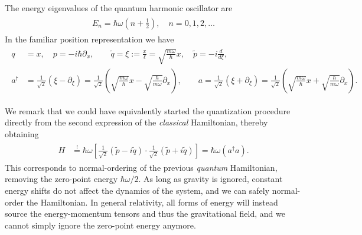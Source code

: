 \documentclass[../QFT_main.tex]{subfiles}
\begin{document}
\begin{mytheorem}
%
The energy eigenvalues of the quantum harmonic oscillator are
{\small\begin{align}\label{eq:quantum_harmonic_oscillator_spectrum}
\begin{aligned}
    E_n = \hbar \omega \left( n + \tfrac{1}{2} \right), \quad n = 0, 1, 2, \ldots
\end{aligned}\end{align}}
%
In the familiar position representation  we have
{\small\begin{align}\label{eq:harmonic_oscillator_position_representation}
\begin{aligned}
    q &= x, \quad p = -i \hbar \partial_x, \qquad
    \tilde{q}=\xi := \tfrac{x}{\ell}=\sqrt{\tfrac{m\omega}{\hbar}} x, \quad \tilde{p} = -i \tfrac{d}{d\xi},\\
    a^\dagger &= \tfrac{1}{\sqrt{2}}\left(\xi-\partial_\xi\right) = \tfrac{1}{\sqrt{2}}\left(\sqrt{\tfrac{m\omega}{\hbar}} x - \sqrt{\tfrac{\hbar}{m\omega}} \partial_x\right), \quad
    \quad a = \tfrac{1}{\sqrt{2}}\left(\xi+\partial_\xi\right)= \tfrac{1}{\sqrt{2}}\left(\sqrt{\tfrac{m\omega}{\hbar}} x + \sqrt{\tfrac{\hbar}{m\omega}} \partial_x\right).
\end{aligned}\end{align}}

We remark that we could have equivalently started the quantization procedure directly from the second expression of the \emph{classical} Hamiltonian, thereby obtaining
{\small\begin{align}\label{eq:normal_ordered_harmonic_oscillator}
\begin{aligned}
    H&\overset{!}{=}\hbar \omega \left[\tfrac{1}{\sqrt{2}}\left( \tilde{p} - i \tilde{q} \right)
        \cdot \tfrac{1}{\sqrt{2}}\left( \tilde{p} + i \tilde{q} \right)\right] = \hbar \omega \left( a^\dagger a \right).
\end{aligned}\end{align}}
This corresponds to normal-ordering of the previous \emph{quantum} Hamiltonian, removing the zero-point energy $\hbar \omega/2$.
As long as gravity is ignored, constant energy shifts do not affect the dynamics of the system, and we can safely normal-order the Hamiltonian.
In general relativity, all forms of energy will instead source the energy-momentum tensors and thus the gravitational field, and we cannot simply ignore the zero-point energy anymore.



\end{mytheorem}
\end{document}
